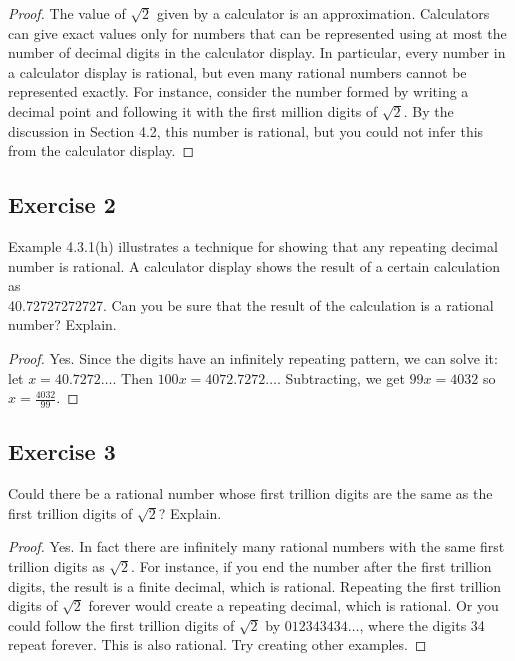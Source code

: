 \documentclass[14pt]{extarticle}
\begin{document}
\begin{proof}
The value of $\sqrt{2}$ given by a calculator is an approximation. Calculators can give exact values only for numbers that can be represented using at most the number of
decimal digits in the calculator display. In particular, every number in a calculator display is rational, but even many rational numbers cannot be represented exactly. For instance, consider the number formed by writing a decimal point and following it with the first million digits of $\sqrt{2}$. By the discussion in Section 4.2, this number is rational, but you could not infer this from the calculator display.
\end{proof}

\subsection{Exercise 2}
Example 4.3.1(h) illustrates a technique for showing that any repeating decimal number is rational. A calculator display shows the result of a certain calculation as \\ 40.72727272727. Can you be sure that the result of the calculation is a rational number? Explain.

\begin{proof}
Yes. Since the digits have an infinitely repeating pattern, we can solve it: let $x = 40.7272\ldots$. Then $100x = 4072.7272\ldots$. Subtracting, we get $99x = 4032$ so $x = \frac{4032}{99}$.
\end{proof}

\subsection{Exercise 3}
Could there be a rational number whose first trillion digits are the same as the first trillion digits of $\sqrt{2}$? Explain.

\begin{proof}
Yes. In fact there are infinitely many rational numbers
with the same first trillion digits as $\sqrt{2}$. For instance, if you end the number after the first trillion digits, the result is a finite decimal, which is rational. Repeating the first trillion digits of $\sqrt{2}$ forever would create a repeating decimal, which is rational. Or you could follow the first trillion digits of $\sqrt{2}$ by $012343434\ldots$, where the digits 34 repeat forever. This is also rational. Try creating other examples.
\end{proof}
\end{document}
